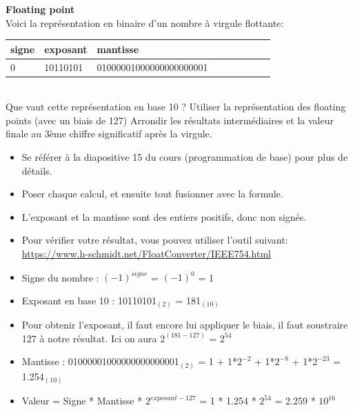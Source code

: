 \begin{Exercice}[10 minutes] \textbf{Floating point}\\
    
    Voici la représentation en binaire d'un nombre à virgule flottante: \\
    
     \begin{tabular}{| p{1cm} | p{3cm} | p{9.5cm} | p{1cm} | p{1cm} | p{1cm} | p{1cm} | p{1cm} | p{1cm} |} 
            \hline
            signe & exposant & mantisse \\ [0.5ex] 
            \hline
            0 & 10110101 & 01000001000000000000001 \\ [0.5ex]
            \hline
	\end{tabular}
	\\
    Que vaut cette représentation en base 10 ? Utiliser la représentation des floating points (avec un biais de 127) Arrondir les résultats intermédiaires et la valeur finale au 3ème chiffre significatif après la virgule. \\
	
    \begin{conseil}
    
    \begin{itemize}
    	\item Se référer à la diapositive 15 du cours (programmation de base) pour plus de détails.
    	\item Poser chaque calcul, et ensuite tout fusionner avec la formule.
    	\item L'exposant et la mantisse sont des entiers positifs, donc non signés.
    	\item Pour vérifier votre résultat, vous pouvez utiliser l'outil suivant: \url{https://www.h-schmidt.net/FloatConverter/IEEE754.html}
    \end{itemize}
    
    \end{conseil}
    
    \begin{solution}
        \begin{itemize}
        	\item Signe du nombre : $(-1)^{signe}$ = $(-1)^0$ = 1
        	\item Exposant en base 10 : 10110101$_{(2)}$ = 181$_{(10)}$
        	\item Pour obtenir l'exposant, il faut encore lui appliquer le biais, il faut soustraire 127 à notre résultat. Ici on aura $2^{(181-127)}$ = $2^{54}$
        	\item Mantisse : 01000001000000000000001$_{(2)}$ = 1 + 1*$2^{-2}$ + 1*$2^{-8}$ + 1*$2^{-23}$ = 1.254$_{(10)}$
        	\item Valeur = Signe * Mantisse * $2^{exposant-127}$ = 1 * 1.254 * $2^{54}$ = 2.259 * $10^{16}$
        \end{itemize}
    \end{solution}
\end{Exercice}
\newpage

